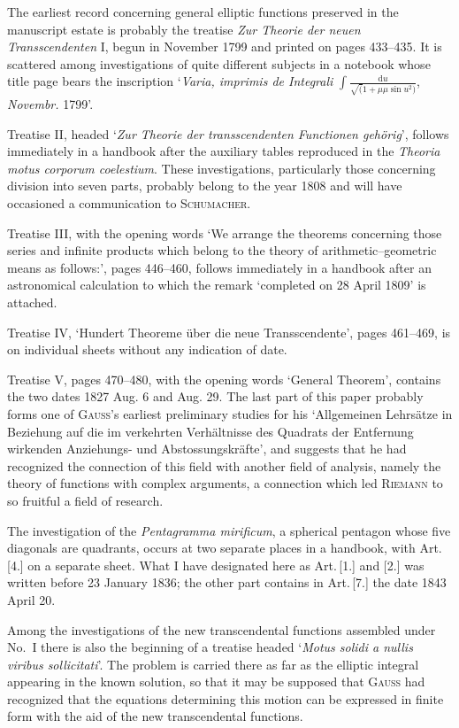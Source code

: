 \medskip
The earliest record concerning general elliptic functions preserved in the manuscript estate is probably the treatise \textit{Zur Theorie der neuen Transscendenten} I, begun in November 1799 and printed on pages 433--435. It is scattered among investigations of quite different subjects in a notebook whose title page bears the inscription `\textit{Varia, imprimis de Integrali} \(\displaystyle\int\frac{\mathrm{d}u}{\surd(1+\mu\mu\sin u^{2})}\), \textit{Novembr.} 1799'.

\medskip
Treatise II, headed `\textit{Zur Theorie der transscendenten Functionen gehörig}', follows immediately in a handbook after the auxiliary tables reproduced in the \textit{Theoria motus corporum coelestium}. These investigations, particularly those concerning division into seven parts, probably belong to the year 1808 and will have occasioned a communication to \textsc{Schumacher}.

\medskip
Treatise III, with the opening words `We arrange the theorems concerning those series and infinite products which belong to the theory of arithmetic–geometric means as follows:', pages 446--460, follows immediately in a handbook after an astronomical calculation to which the remark `completed on 28 April 1809' is attached.

\medskip
Treatise IV, `Hundert Theoreme über die neue Transscendente', pages 461--469, is on individual sheets without any indication of date.

\medskip
Treatise V, pages 470--480, with the opening words `General Theorem', contains the two dates 1827 Aug. 6 and Aug. 29. The last part of this paper probably forms one of \textsc{Gauss}’s earliest preliminary studies for his `Allgemeinen Lehrsätze in Beziehung auf die im verkehrten Verhältnisse des Quadrats der Entfernung wirkenden Anziehungs- und Abstossungskräfte', and suggests that he had recognized the connection of this field with another field of analysis, namely the theory of functions with complex arguments, a connection which led \textsc{Riemann} to so fruitful a field of research.

\medskip
The investigation of the \textit{Pentagramma mirificum}, a spherical pentagon whose five diagonals are quadrants, occurs at two separate places in a handbook, with Art.\,[4.] on a separate sheet. What I have designated here as Art.\,[1.] and [2.] was written before 23 January 1836; the other part contains in Art.\,[7.] the date 1843 April 20.

\medskip
Among the investigations of the new transcendental functions assembled under No.\ I there is also the beginning of a treatise headed ‘\textit{Motus solidi a nullis viribus sollicitati}’. The problem is carried there as far as the elliptic integral appearing in the known solution, so that it may be supposed that \textsc{Gauss} had recognized that the equations determining this motion can be expressed in finite form with the aid of the new transcendental functions.

